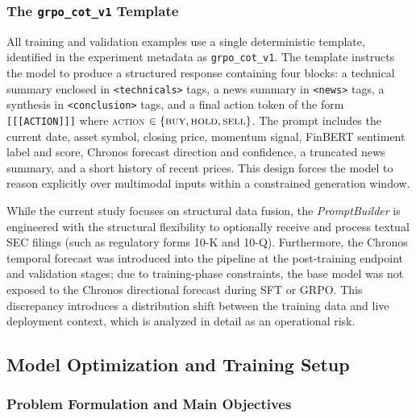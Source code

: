     \subsubsection{The \texttt{grpo\_cot\_v1} Template}
    All training and validation examples use a single deterministic template, identified in the experiment metadata as \texttt{grpo\_cot\_v1}. The template instructs the model to produce a structured response containing four blocks: a technical summary enclosed in \texttt{<technicals>} tags, a news summary in \texttt{<news>} tags, a synthesis in \texttt{<conclusion>} tags, and a final action token of the form \texttt{[[[ACTION]]]} where \textsc{action} $\in \{\textsc{buy}, \textsc{hold}, \textsc{sell}\}$. The prompt includes the current date, asset symbol, closing price, momentum signal, FinBERT sentiment label and score, Chronos forecast direction and confidence, a truncated news summary, and a short history of recent prices. This design forces the model to reason explicitly over multimodal inputs within a constrained generation window.

    While the current study focuses on structural data fusion, the \textit{PromptBuilder} is engineered with the structural flexibility to optionally receive and process textual SEC filings (such as regulatory forms 10-K and 10-Q). Furthermore, the Chronos temporal forecast was introduced into the pipeline at the post-training endpoint and validation stages; due to training-phase constraints, the base model was not exposed to the Chronos directional forecast during SFT or GRPO. This discrepancy introduces a distribution shift between the training data and live deployment context, which is analyzed in detail as an operational risk.

    \subsection{Model Optimization and Training Setup}

    \subsubsection{Problem Formulation and Main Objectives}

